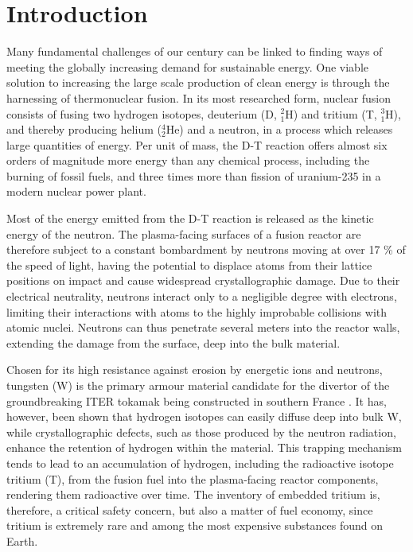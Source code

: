 \chapter{Introduction}

Many fundamental challenges of our century can be linked to finding ways of meeting the globally increasing demand for sustainable energy. 
One viable solution to increasing the large scale production of clean energy is through the harnessing of thermonuclear fusion. 
In its most researched form, nuclear fusion consists of fusing two hydrogen isotopes, deuterium (D, $^2_1$H) and tritium (T, $^3_1$H), and thereby producing helium ($^4_2$He) and a neutron, in a process which releases large quantities of energy. 
Per unit of mass, the D-T reaction offers almost six orders of magnitude more energy than any chemical process, including the burning of fossil fuels, and three times more than fission of uranium-235 in a modern nuclear power plant.  

Most of the energy emitted from the D-T reaction is released as the kinetic energy of the neutron. 
The plasma-facing surfaces of a fusion reactor are therefore subject to a constant bombardment by neutrons moving at over 17 \% of the speed of light, having the potential to displace atoms from their lattice positions on impact and cause widespread crystallographic damage. 
Due to their electrical neutrality, neutrons interact only to a negligible degree with electrons, limiting their interactions with atoms to the highly improbable collisions with atomic nuclei. 
Neutrons can thus penetrate several meters into the reactor walls, extending the damage from the surface, deep into the bulk material. 

Chosen for its high resistance against erosion by energetic ions and neutrons, tungsten (W) is the primary armour material candidate for the divertor of the groundbreaking ITER tokamak being constructed in southern France \cite{hirai2013iter}.
It has, however, been shown that hydrogen isotopes can easily diffuse deep into bulk W, while crystallographic defects, such as those produced by the neutron radiation, enhance the retention of hydrogen within the material. \cite{tanabe2014review} 
This trapping mechanism tends to lead to an accumulation of hydrogen, including the radioactive isotope tritium (T), from the fusion fuel into the plasma-facing reactor components, rendering them radioactive over time. 
The inventory of embedded tritium is, therefore, a critical safety concern, but also a matter of fuel economy, since tritium is extremely rare and among the most expensive substances found on Earth.

